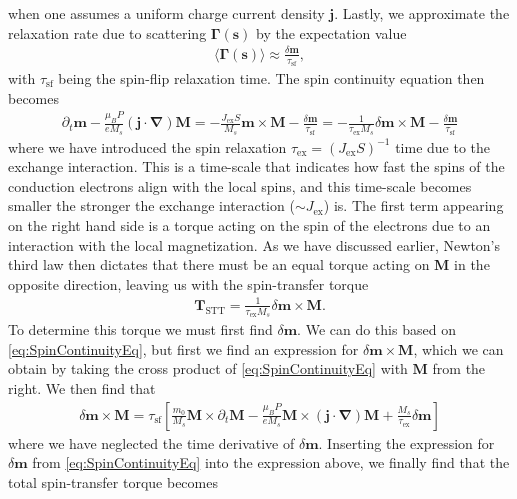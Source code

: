 when one assumes a uniform charge current density $\mathbold{j}$. Lastly, we approximate the relaxation rate due to scattering $\mathbold{\Gamma}(\mathbold{s})$ by the expectation value 
\begin{align}
\langle\mathbold{\Gamma}(\mathbold{s})\rangle \approx \frac{\delta\mathbold{m}}{\tau_{\textrm{sf}}},
\end{align}
with $\tau_{\textrm{sf}}$ being the spin-flip relaxation time. The spin continuity equation then becomes
\begin{align}
\partial_t\mathbold{m} -\frac{\mu_B P}{e M_s}\left(\mathbold{j}\cdot\mathbold{\nabla}\right)\mathbold{M} =   -\frac{J_{\textrm{ex}} S}{M_s}\mathbold{m}\times\mathbold{M} - \frac{\delta\mathbold{m}}{\tau_{\textrm{sf}}} =    -\frac{1}{\tau_{\textrm{ex}}M_s}\delta\mathbold{m}\times\mathbold{M} - \frac{\delta\mathbold{m}}{\tau_{\textrm{sf}}} \label{eq:SpinContinuityEq}
\end{align}
where we have introduced the spin relaxation $\tau_{\textrm{ex}} = (J_{\textrm{ex}}S)^{-1}$ time due to the exchange interaction. This is a time-scale that indicates how fast the spins of the conduction electrons align with the local spins, and this time-scale becomes smaller the stronger the exchange interaction ($\sim J_{\text{ex}}$) is. The first term appearing on the right hand side is a torque acting on the spin of the electrons due to an interaction with the local magnetization. As we have discussed earlier, Newton's third law then dictates that there must be an equal torque acting on $\mathbold{M}$ in the opposite direction, leaving us with the spin-transfer torque
\begin{align}
\mathbold{T}_{\text{STT}} = \frac{1}{\tau_{\textrm{ex}}M_s}\delta\mathbold{m}\times\mathbold{M}.
\end{align}
To determine this torque we must first find $\delta\mathbold{m}$. We can do this based on \eqref{eq:SpinContinuityEq}, but first we find an expression for $\delta \mathbold{m} \times \mathbold{M}$, which we can obtain by taking the cross product of \eqref{eq:SpinContinuityEq} with $\mathbold{M}$ from the right. We then find that
\begin{align}
\delta\mathbold{m}\times\mathbold{M} = \tau_{\textrm{sf}}\left[\frac{m_0}{M_s}\mathbold{M}\times\partial_t\mathbold{M} - \frac{\mu_B P}{e M_s} \mathbold{M}\times(\mathbold{j}\cdot\mathbold{\nabla})\mathbold{M} + \frac{M_s}{\tau_{\textrm{ex}}}\delta\mathbold{m} \right]
\end{align}
where we have neglected the time derivative of $\delta\mathbold{m}$. Inserting the expression for $\delta\mathbold{m}$ from \eqref{eq:SpinContinuityEq} into the expression above, we finally find that the total spin-transfer torque becomes
